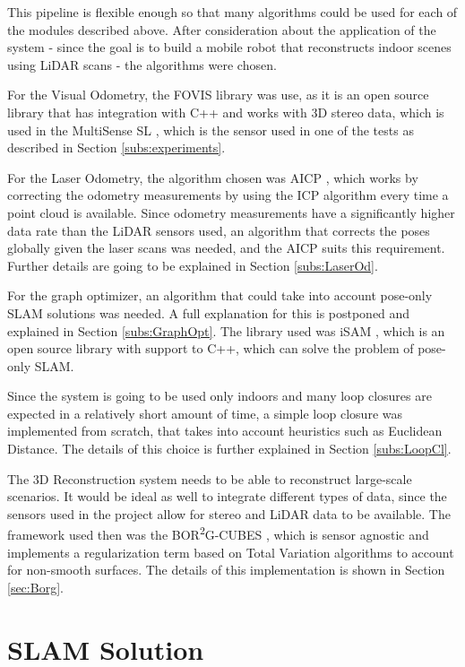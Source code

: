 \documentclass[11pt]{article}
\begin{document}
This pipeline is flexible enough so that many algorithms could be used for each of the modules described above. After consideration about the application of the system - since the goal is to build a mobile robot that reconstructs indoor scenes using LiDAR scans - the algorithms were chosen.
	
For the Visual Odometry, the FOVIS library \cite{fovis} was use, as it is an open source library that has integration with C++ and works with 3D stereo data, which is used in the MultiSense SL \cite{multisense}, which is the sensor used in one of the tests as described in Section \ref{subs:experiments}.
	
For the Laser Odometry, the algorithm chosen was AICP \cite{7989547}, which works by correcting the odometry measurements by using the ICP algorithm every time a point cloud is available. Since odometry measurements have a significantly higher data rate than the LiDAR sensors used, an algorithm that corrects the poses globally given the laser scans was needed, and the AICP suits this requirement. Further details are going to be explained in Section \ref{subs:LaserOd}.
	
For the graph optimizer, an algorithm that could take into account pose-only SLAM solutions was needed. A full explanation for this is postponed and explained in Section \ref{subs:GraphOpt}. The library used was iSAM \cite{Kaess08tro}, which is an open source library with support to C++, which can solve the problem of pose-only SLAM.
	
Since the system is going to be used only indoors and many loop closures are expected in a relatively short amount of time, a simple loop closure was implemented from scratch, that takes into account heuristics such as Euclidean Distance. The details of this choice is further explained in Section \ref{subs:LoopCl}.
	
The 3D Reconstruction system needs to be able to reconstruct large-scale scenarios. It would be ideal as well to integrate different types of data, since the sensors used in the project allow for stereo and LiDAR data to be available. The framework used then was the BOR\textsuperscript{2}G-CUBES \cite{TannerFSR2015}\cite{TannerArXiv2016}, which is sensor agnostic and implements a regularization term based on Total Variation algorithms to account for non-smooth surfaces. The details of this implementation is shown in Section \ref{sec:Borg}.
		
	\newpage
	\section{SLAM Solution}
\end{document}
